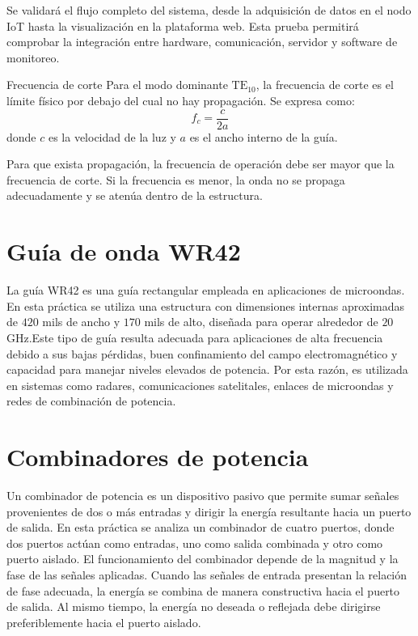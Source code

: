 Se validará el flujo completo del sistema, desde la adquisición de datos en el nodo IoT hasta la visualización en la plataforma web. Esta prueba permitirá comprobar la integración entre hardware, comunicación, servidor y software de monitoreo.

\begin{conceptcard}{Frecuencia de corte}
Para el modo dominante $\text{TE}_{10}$, la frecuencia de corte es el límite físico por debajo del cual no hay propagación. Se expresa como:
\begin{equation}
f_c = \frac{c}{2a}
\end{equation}
donde $c$ es la velocidad de la luz y $a$ es el ancho interno de la guía.
\end{conceptcard}

Para que exista propagación, la frecuencia de operación debe ser mayor que la frecuencia de corte. Si la frecuencia es menor, la onda no se propaga adecuadamente y se atenúa dentro de la estructura.

\section{Guía de onda WR42}

La guía WR42 es una guía rectangular empleada en aplicaciones de microondas. En esta práctica se utiliza una estructura con dimensiones internas aproximadas de $420$ mils de ancho y $170$ mils de alto, diseñada para operar alrededor de $20$ GHz.Este tipo de guía resulta adecuada para aplicaciones de alta frecuencia debido a sus bajas pérdidas, buen confinamiento del campo electromagnético y capacidad para manejar niveles elevados de potencia. Por esta razón, es utilizada en sistemas como radares, comunicaciones satelitales, enlaces de microondas y redes de combinación de potencia.

\section{Combinadores de potencia}

Un combinador de potencia es un dispositivo pasivo que permite sumar señales provenientes de dos o más entradas y dirigir la energía resultante hacia un puerto de salida. En esta práctica se analiza un combinador de cuatro puertos, donde dos puertos actúan como entradas, uno como salida combinada y otro como puerto aislado. El funcionamiento del combinador depende de la magnitud y la fase de las señales aplicadas. Cuando las señales de entrada presentan la relación de fase adecuada, la energía se combina de manera constructiva hacia el puerto de salida. Al mismo tiempo, la energía no deseada o reflejada debe dirigirse preferiblemente hacia el puerto aislado.

